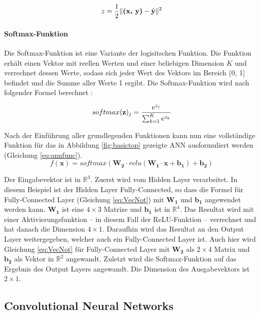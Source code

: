 \begin{equation}
z = \frac{1}{2}\|\textbf{(x, y)} - \hat{\textbf{y}}\|^2
\end{equation}


\paragraph{Softmax-Funktion}

Die Softmax-Funktion ist eine Variante der logisitschen Funktion. Die Funktion erh\"alt einen Vektor  mit reellen Werten und einer beliebigen Dimension $K$ und verrechnet dessen Werte, sodass sich jeder Wert des Vektors  im Bereich (0, 1] befindet und die Summe aller Werte 1 ergibt. Die Softmax-Funktion wird nach folgender Formel berechnet \parencite{Goodfellow-et-al-2016}:

\begin{equation}
softmax(\textbf{z})_j = \frac{\mathrm{e}^{z_j}}{\sum_{k=1}^K \mathrm{e}^{z_k}}
\end{equation}

Nach der Einführung aller grundlegenden Funktionen kann nun eine vollständige Funktion für das in Abbildung \ref{fig:basictop} gezeigte ANN ausformuliert werden (Gleichung \ref{eq:annfunc}).
\begin{equation}
f(\mathbf{x}) = softmax(\mathbf{W_2} \cdot relu(\mathbf{W_1} \cdot \mathbf{x} + \mathbf{b_1}) + \mathbf{b_2} )
\label{eq:annfunc}
\end{equation}


Der Eingabevektor  ist in $\mathbb{R}^3$. Zuerst wird  vom Hidden Layer verarbeitet. In diesem Beispiel ist der Hidden Layer Fully-Connected, so dass die Formel für Fully-Connected Layer (Gleichung \ref{eq:VecNot}) mit $\mathbf{W_1}$ und $\mathbf{b_1}$ angewendet werden kann. $\mathbf{W_1}$ ist eine $4 \times 3$ Matrize und $\mathbf{b_1}$ ist in $\mathbb{R}^4$. Das Resultat wird mit einer Aktivierungsfunktion -- in diesem Fall der ReLU-Funktion -- verrechnet und hat danach die Dimension $4\times1$. Daraufhin wird das Resultat an den Output Layer weitergegeben, welcher auch ein Fully-Connected Layer ist. Auch hier wird Gleichung \ref{eq:VecNot} für Fully-Connected Layer mit $\mathbf{W_2}$ als $2\times4$ Matrix und $\mathbf{b_2}$ als Vektor in $\mathbb{R}^2$ angewandt. Zuletzt wird die Softmax-Funktion auf das Ergebnis des Output Layers angewandt. Die Dimension des Ausgabevektors ist $2\times1$.


\subsection{Convolutional Neural Networks}

